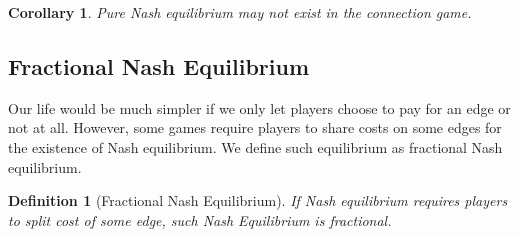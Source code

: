 \documentclass[11pt,psfig,times]{article}
\newtheorem{corollary}{Corollary}[section]
\newtheorem{definition}{Definition}[section]
\begin{document}
\begin{corollary}
Pure Nash equilibrium may not exist in the connection game.
\end{corollary}

    
\subsection{Fractional Nash Equilibrium}
Our life would be much simpler if we only let players choose to pay for an edge or not at all. However, some games require players to share costs on some edges for the existence of Nash equilibrium. We define such equilibrium as fractional Nash equilibrium.

\begin{definition}[Fractional Nash Equilibrium]If Nash equilibrium requires players to split cost of some edge, such Nash Equilibrium is fractional.	
\end{definition}
\end{document}
